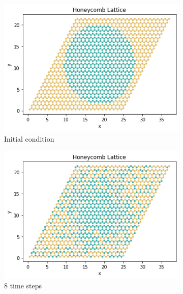 \documentclass{article}
\begin{document}
\begin{figure}
     \centering
     \begin{subfigure}[b]{0.3\textwidth}
         \centering
         \includegraphics[width=\textwidth]{step0.png}
         \caption{Initial condition}
         \label{fig:s0}
     \end{subfigure}
     \hfill
     \begin{subfigure}[b]{0.3\textwidth}
         \centering
         \includegraphics[width=\textwidth]{step8.png}
         \caption{8 time steps}
         \label{fig:s8}
     \end{subfigure}
     \hfill
     \begin{subfigure}[b]{0.3\textwidth}
         \centering

\end{subfigure}
\end{figure}
\end{document}
